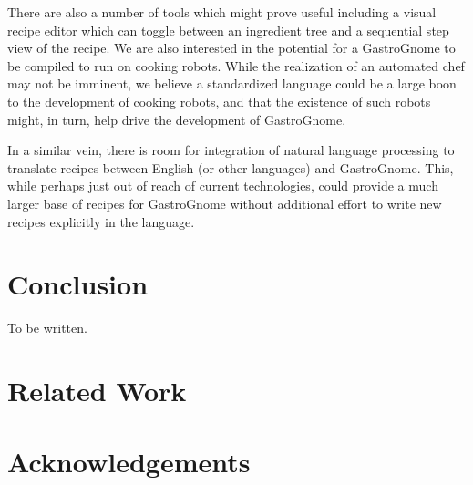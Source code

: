 \documentclass[pldi]{sigplanconf-pldi15}
\begin{document}
There are also a number of tools which might prove useful including a visual
recipe editor which can toggle between an ingredient tree and a sequential
step view of the recipe. We are also interested in the potential for a
GastroGnome to be compiled to run on cooking robots. While the realization of
an automated chef may not be imminent, we believe a standardized language
could be a large boon to the development of cooking robots, and that the
existence of such robots might, in turn, help drive the development of
GastroGnome.

In a similar vein, there is room for integration of natural language
processing to translate recipes between English (or other languages) and
GastroGnome. This, while perhaps just out of reach of current technologies,
could provide a much larger base of recipes for GastroGnome without additional
effort to write new recipes explicitly in the language.


\section{Conclusion}
To be written.

\section{Related Work}

\section{Acknowledgements}




\nocite{*}
\end{document}
